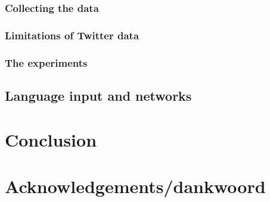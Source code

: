 \documentclass[12pt]{article}
\let\stdsection\section
\renewcommand\section{\newpage\stdsection}
\begin{document}
\subsubsection{Collecting the data}

\subsubsection{Limitations of Twitter data}

\subsubsection{The experiments}

\subsection{Language input and networks}

\section{Conclusion}


\section*{Acknowledgements/dankwoord}

\end{document}
